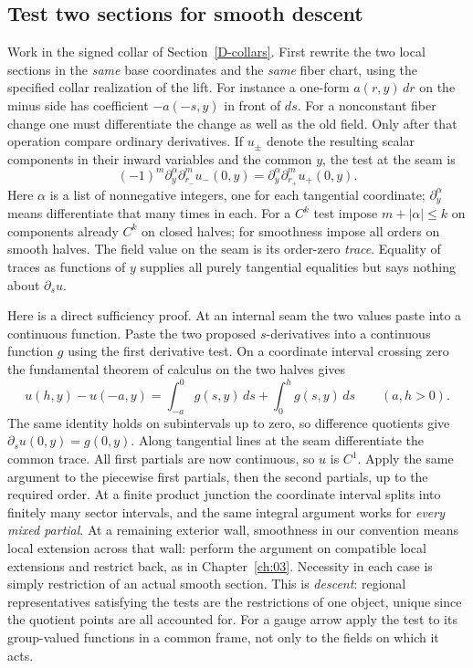 \subsection{Test two sections for smooth descent}
Work in the signed collar of Section~\ref{D-collars}. First rewrite the two local sections in the \emph{same} base coordinates and the \emph{same} fiber chart, using the specified collar realization of the lift. For instance a one-form $a(r,y)\,dr$ on the minus side has coefficient $-a(-s,y)$ in front of $ds$. For a nonconstant fiber change one must differentiate the change as well as the old field. Only after that operation compare ordinary derivatives. If $u_\pm$ denote the resulting scalar components in their inward variables and the common $y$, the test at the seam is
\begin{equation}
 (-1)^m \partial_y^\alpha\partial_{r_-}^m u_-(0,y)
   =\partial_y^\alpha\partial_{r_+}^m u_+(0,y).
 \label{D-field-test}
\end{equation}
Here $\alpha$ is a list of nonnegative integers, one for each tangential coordinate; $\partial_y^\alpha$ means differentiate that many times in each. For a $C^k$ test impose $m+|\alpha|\leq k$ on components already $C^k$ on closed halves; for smoothness impose all orders on smooth halves. The field value on the seam is its order-zero \emph{trace}. Equality of traces as functions of $y$ supplies all purely tangential equalities but says nothing about $\partial_s u$.

Here is a direct sufficiency proof. At an internal seam the two values paste into a continuous function. Paste the two proposed $s$-derivatives into a continuous function $g$ using the first derivative test. On a coordinate interval crossing zero the fundamental theorem of calculus on the two halves gives
\[
 u(h,y)-u(-a,y)=\int_{-a}^{0}g(s,y)\,ds+\int_0^h g(s,y)\,ds
 \qquad(a,h>0).
\]
The same identity holds on subintervals up to zero, so difference quotients give $\partial_s u(0,y)=g(0,y)$. Along tangential lines at the seam differentiate the common trace. All first partials are now continuous, so $u$ is $C^1$. Apply the same argument to the piecewise first partials, then the second partials, up to the required order. At a finite product junction the coordinate interval splits into finitely many sector intervals, and the same integral argument works for \emph{every mixed partial}. At a remaining exterior wall, smoothness in our convention means local extension across that wall: perform the argument on compatible local extensions and restrict back, as in Chapter~\ref{ch:03}. Necessity in each case is simply restriction of an actual smooth section. This is \emph{descent}: regional representatives satisfying the tests are the restrictions of one object, unique since the quotient points are all accounted for. For a gauge arrow apply the test to its group-valued functions in a common frame, not only to the fields on which it acts.

